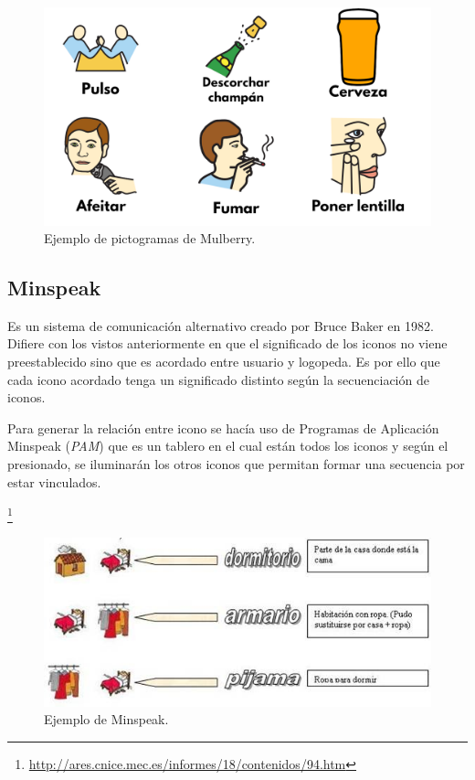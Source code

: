 \begin{figure}[h!]
	\centering
	\includegraphics[scale=0.2]{Imagenes/Bitmap/Mulberry}
	\caption{Ejemplo de pictogramas de Mulberry.}
	\label{fig:mulberry}
\end{figure}

\newpage
\subsection{Minspeak}
Es un sistema de comunicación alternativo creado por Bruce Baker en 1982. Difiere con los vistos anteriormente en que el significado de los iconos no viene preestablecido sino que es acordado entre usuario y logopeda. Es por ello que cada icono acordado tenga un significado distinto según la secuenciación de iconos.

Para generar la relación entre icono se hacía uso de Programas de Aplicación Minspeak (\textit{PAM}) que es un tablero en el cual están todos los iconos y según el presionado, se iluminarán los otros iconos que permitan formar una secuencia por estar vinculados.

\footnote{\url{http://ares.cnice.mec.es/informes/18/contenidos/94.htm}}
\begin{figure}[h!]
	\centering
	\includegraphics[width=0.7\linewidth]{Imagenes/Bitmap/Minspeak}
	\caption{Ejemplo de Minspeak.}
	\label{fig:minspeak}
\end{figure}


